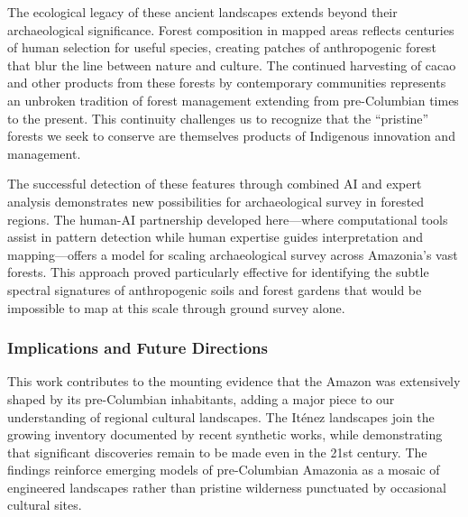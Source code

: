 \documentclass[
  letterpaper,
  DIV=11,
  numbers=noendperiod]{scrartcl}
\begin{document}
The ecological legacy of these ancient landscapes extends beyond their
archaeological significance. Forest composition in mapped areas reflects
centuries of human selection for useful species, creating patches of
anthropogenic forest that blur the line between nature and culture. The
continued harvesting of cacao and other products from these forests by
contemporary communities represents an unbroken tradition of forest
management extending from pre-Columbian times to the present. This
continuity challenges us to recognize that the ``pristine'' forests we
seek to conserve are themselves products of Indigenous innovation and
management.

The successful detection of these features through combined AI and
expert analysis demonstrates new possibilities for archaeological survey
in forested regions. The human-AI partnership developed here---where
computational tools assist in pattern detection while human expertise
guides interpretation and mapping---offers a model for scaling
archaeological survey across Amazonia's vast forests. This approach
proved particularly effective for identifying the subtle spectral
signatures of anthropogenic soils and forest gardens that would be
impossible to map at this scale through ground survey alone.

\subsubsection{Implications and Future
Directions}\label{implications-and-future-directions}

This work contributes to the mounting evidence that the Amazon was
extensively shaped by its pre-Columbian inhabitants, adding a major
piece to our understanding of regional cultural landscapes. The Iténez
landscapes join the growing inventory documented by recent synthetic
works, while demonstrating that significant discoveries remain to be
made even in the 21st century. The findings reinforce emerging models of
pre-Columbian Amazonia as a mosaic of engineered landscapes rather than
pristine wilderness punctuated by occasional cultural sites.
\end{document}

